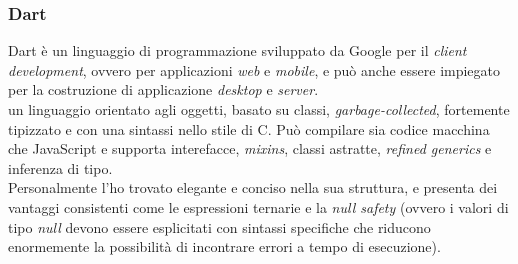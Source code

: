 \subsubsection{Dart}
Dart è un linguaggio di programmazione sviluppato da Google per il \textit{client development}, ovvero per applicazioni \textit{web} e \textit{mobile}, e può anche essere impiegato per la costruzione di applicazione \textit{desktop} e \textit{server}.\\
\e{} un linguaggio orientato agli oggetti, basato su classi, \textit{garbage-collected}, fortemente tipizzato e con una sintassi nello stile di C. Può compilare sia codice macchina che JavaScript e supporta interefacce, \textit{mixins}, classi astratte, \textit{refined generics} e inferenza di tipo.\\
Personalmente l'ho trovato elegante e conciso nella sua struttura, e presenta dei vantaggi consistenti come le espressioni ternarie e la \textit{null safety} (ovvero i valori di tipo \textit{null} devono essere esplicitati con sintassi specifiche che riducono enormemente la possibilità di incontrare errori a tempo di esecuzione).

